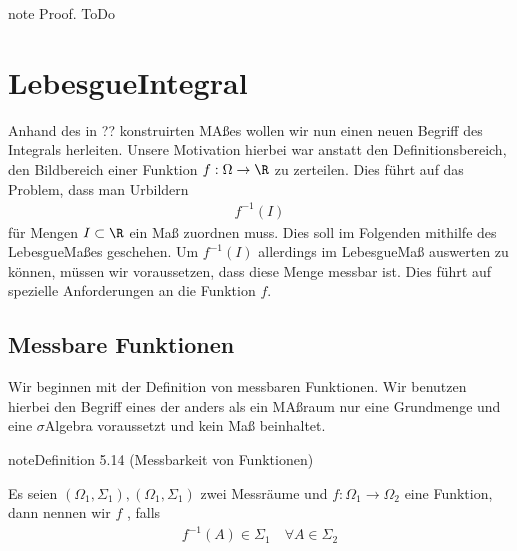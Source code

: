 \documentclass[letterpaper,10pt,english]{jupyterBook}
\begin{document}
\begin{sphinxadmonition}{note}
\sphinxAtStartPar
Proof. ToDo
\end{sphinxadmonition}


\section{Lebesgue\sphinxhyphen{}Integral}
\label{\detokenize{masstheorie/lebesgue_integral:lebesgue-integral}}\label{\detokenize{masstheorie/lebesgue_integral::doc}}
\sphinxAtStartPar
Anhand des in ?? konstruirten MAßes wollen wir nun einen neuen Begriff des Integrals herleiten. Unsere Motivation hierbei war anstatt den Definitionsbereich, den Bildbereich einer Funktion \(f:\Omega\to\R\) zu zerteilen. Dies führt auf das Problem, dass man Urbildern
\begin{equation*}
\begin{split}f^{-1}(I)\end{split}
\end{equation*}
\sphinxAtStartPar
für Mengen \(I\subset\R\) ein Maß zuordnen muss. Dies soll im Folgenden mithilfe des Lebesgue\sphinxhyphen{}Maßes geschehen. Um \(f^{-1}(I)\) allerdings im Lebesgue\sphinxhyphen{}Maß auswerten zu können, müssen wir voraussetzen, dass diese Menge messbar ist. Dies führt auf spezielle Anforderungen an die Funktion \(f\).


\subsection{Messbare Funktionen}
\label{\detokenize{masstheorie/lebesgue_integral:messbare-funktionen}}
\sphinxAtStartPar
Wir beginnen mit der Definition von messbaren Funktionen. Wir benutzen hierbei den Begriff eines  der anders als ein MAßraum nur eine Grundmenge und eine \(\sigma\)\sphinxhyphen{}Algebra voraussetzt und kein Maß beinhaltet.
\label{masstheorie/lebesgue_integral:definition-0}
\begin{sphinxadmonition}{note}{Definition 5.14 (Messbarkeit von Funktionen)}



\sphinxAtStartPar
Es seien \((\Omega_1,\Sigma_1), (\Omega_1,\Sigma_1)\) zwei Messräume und \(f:\Omega_1\to\Omega_2\) eine Funktion, dann nennen wir \(f\) , falls
\begin{equation*}
\begin{split}f^{-1}(A)\in\Sigma_1\quad\forall A\in\Sigma_2\end{split}
\end{equation*}\end{sphinxadmonition}
\end{document}
